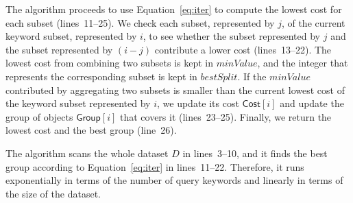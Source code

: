 \documentclass{sig-alternate}
\newcommand{\Cost}{\mbox{$\mathsf{Cost}$}}
\newcommand{\Group}{\mbox{$\mathsf{Group}$}}
\begin{document}
The algorithm proceeds to use Equation~\ref{eq:iter} to compute
the lowest cost for each subset (lines~11--25). We check each
subset, represented by $j$, of the current keyword subset,
represented by $i$, to see whether the subset represented by $j$ and
the subset represented by $(i -j)$ contribute a lower cost
(lines~13--22). The lowest cost from combining two subsets is kept
in $minValue$, and the integer that represents the corresponding subset
is kept in $bestSplit$.
%
If the $minValue$ contributed by aggregating two subsets is smaller
than the current lowest cost of the keyword subset represented by $i$,
we update its cost $\Cost[i]$ and update the group of objects
$\Group[i]$ that covers it (lines~23--25). Finally, we return the
lowest cost and the best group (line~26).


The algorithm scans the whole dataset $D$ in lines~3--10, and it
finds the best group according to Equation~\ref{eq:iter} in lines~11--22.
Therefore, it runs exponentially in terms of the number of query keywords
and linearly in terms of the size of the dataset.
\end{document}
